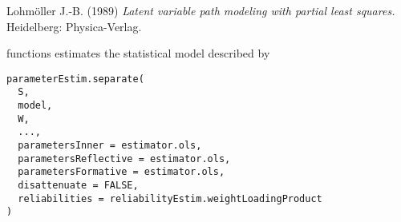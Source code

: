 \documentclass[a4paper]{book}
\begin{document}
%
\begin{References}\relax
Lohmöller J.-B. (1989) \emph{Latent variable path modeling with partial least squares.} Heidelberg: Physica-Verlag.
\end{References}
%
\begin{Description}\relax
{} functions estimates the statistical model described by 
\end{Description}
%
\begin{Usage}
\begin{verbatim}
parameterEstim.separate(
  S,
  model,
  W,
  ...,
  parametersInner = estimator.ols,
  parametersReflective = estimator.ols,
  parametersFormative = estimator.ols,
  disattenuate = FALSE,
  reliabilities = reliabilityEstim.weightLoadingProduct
)
\end{verbatim}
\end{Usage}
%
\end{document}
